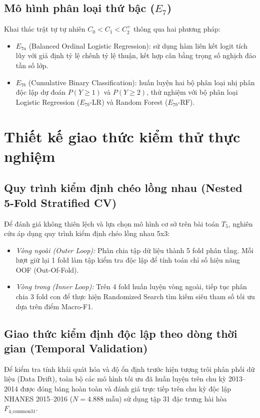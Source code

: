 \subsection{Mô hình phân loại thứ bậc ($E_7$)}
Khai thác trật tự tự nhiên $C_0 < C_1 < C_2^+$ thông qua hai phương pháp:
\begin{itemize}
    \item $E_{7a}$ (Balanced Ordinal Logistic Regression): sử dụng hàm liên kết logit tích lũy với giả định tỷ lệ chênh tỷ lệ thuận, kết hợp cân bằng trọng số nghịch đảo tần số lớp.
    \item $E_{7b}$ (Cumulative Binary Classification): huấn luyện hai bộ phân loại nhị phân độc lập dự đoán $P(Y \ge 1)$ và $P(Y \ge 2)$, thử nghiệm với bộ phân loại Logistic Regression ($E_{7b}\text{-LR}$) và Random Forest ($E_{7b}\text{-RF}$).
\end{itemize}

\section{Thiết kế giao thức kiểm thử thực nghiệm}
\label{sec:giao-thuc-kiem-thu}

\subsection{Quy trình kiểm định chéo lồng nhau (Nested 5-Fold Stratified CV)}
Để đánh giá không thiên lệch và lựa chọn mô hình cơ sở trên bài toán $T_5$, nghiên cứu áp dụng quy trình kiểm định chéo lồng nhau 5x3:
\begin{itemize}
    \item \textit{Vòng ngoài (Outer Loop):} Phân chia tập dữ liệu thành 5 fold phân tầng. Mỗi lượt giữ lại 1 fold làm tập kiểm tra độc lập để tính toán chỉ số hiệu năng OOF (Out-Of-Fold).
    \item \textit{Vòng trong (Inner Loop):} Trên 4 fold huấn luyện vòng ngoài, tiếp tục phân chia 3 fold con để thực hiện Randomized Search tìm kiếm siêu tham số tối ưu dựa trên điểm Macro-F1.
\end{itemize}

\subsection{Giao thức kiểm định độc lập theo dòng thời gian (Temporal Validation)}
Để kiểm tra tính khái quát hóa và độ ổn định trước hiện tượng trôi phân phối dữ liệu (Data Drift), toàn bộ các mô hình tối ưu đã huấn luyện trên chu kỳ 2013--2014 được đóng băng hoàn toàn và đánh giá trực tiếp trên chu kỳ độc lập NHANES 2015--2016 ($N = 4.888$ mẫu) sử dụng tập 31 đặc trưng hài hòa $F_{4\_\text{common31}}$.

